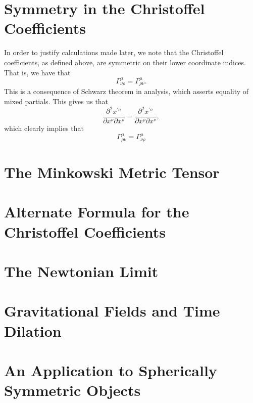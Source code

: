 \documentclass[12pt]{article}
\theoremstyle{definition}
\theoremstyle{remark}
\begin{document}
\section{Symmetry in the Christoffel Coefficients}

In order to justify calculations made later, we note that the Christoffel coefficients, as defined above, are symmetric on their lower coordinate indices.  That is, we have that 
\[
\Gamma^{ \mu }_{ \nu \rho } 
= 
\Gamma^{ \mu }_{ \rho \nu }.
\]
This is a consequence of Schwarz theorem in analysis, which asserts equality of mixed partials.  This gives us that 
\[
\frac{ \partial^2 x^{ \prime \sigma } }{ \partial x^{ \nu }  \partial x^{ \rho } } 
=
\frac{ \partial^2 x^{ \prime \sigma } }{ \partial x^{ \rho }  \partial x^{ \nu } },
\]
which clearly implies that 
\[
\Gamma_{ \rho \nu }^{ \mu } = \Gamma_{ \nu \rho }^{ \mu } 
\]




\section{The Minkowski Metric Tensor}

\section{Alternate Formula for the Christoffel Coefficients}

\section{The Newtonian Limit}

\section{Gravitational Fields and Time Dilation}

\section{An Application to Spherically Symmetric Objects}













































\end{document}
